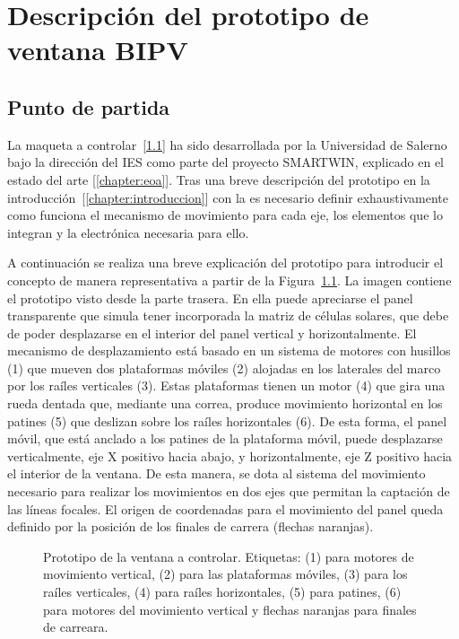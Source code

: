 \chapter{Descripción del prototipo de ventana BIPV}

\section{Punto de partida}

La maqueta a controlar~[\ref{fig:ventana}] ha sido desarrollada por la Universidad de Salerno bajo la dirección del IES como parte del proyecto SMARTWIN, explicado en el estado del arte [\ref{chapter:eoa}]. Tras una breve descripción del prototipo en la introducción~[\ref{chapter:introduccion}] con la es necesario definir exhaustivamente como funciona el mecanismo de movimiento para cada eje, los elementos que lo integran y la electrónica necesaria para ello.

A continuación se realiza una breve explicación del prototipo para introducir el concepto de manera representativa a partir de la Figura~\ref{fig:ventana}. La imagen contiene el prototipo visto desde la parte trasera. En ella puede apreciarse el panel transparente que simula tener incorporada la matriz de células solares, que debe de poder desplazarse en el interior del panel vertical y horizontalmente. El mecanismo de desplazamiento está basado en un sistema de motores con husillos (1) que mueven dos plataformas móviles (2) alojadas en los laterales del marco por los raíles verticales (3). Estas plataformas tienen un motor (4) que gira una rueda dentada que, mediante una correa, produce movimiento horizontal en los patines (5) que deslizan sobre los raíles horizontales (6). De esta forma, el panel móvil, que está anclado a los patines de la plataforma móvil, puede desplazarse verticalmente, eje X positivo hacia abajo, y horizontalmente, eje Z positivo hacia el interior de la ventana. De esta manera, se dota al sistema del movimiento necesario para realizar los movimientos en dos ejes que permitan la captación de las líneas focales. El origen de coordenadas para el movimiento del panel queda definido por la posición de los finales de carrera (flechas naranjas).

\begin{figure}[h]
	\centering
	
	\caption{Prototipo de la ventana a controlar. Etiquetas: (1) para motores de movimiento vertical, (2) para las plataformas móviles, (3) para los raíles verticales, (4) para raíles horizontales, (5) para patines, (6) para motores del movimiento vertical y flechas naranjas para finales de carreara.}
	\label{fig:ventana}
\end{figure}
\FloatBarrier

